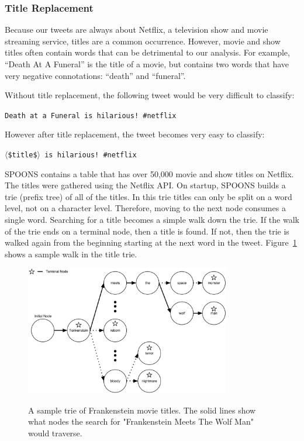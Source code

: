 \documentclass[12pt]{ucthesis}
\newcommand{\captionfonts}{\small\bf\ssp}
\begin{document}
\subsubsection{Title Replacement}
\label{class-filter-title}
Because our tweets are always about Netflix, a television show and movie streaming service,
titles are a common occurrence. However, movie and show titles often contain words that can be
detrimental to our analysis. For example, ``Death At A Funeral'' is the title of a movie, but contains
two words that have very negative connotations: ``death'' and ``funeral''.

Without title replacement, the following tweet would be very difficult to classify:

\begin{center}
   \texttt{Death at a Funeral is hilarious!  \#netflix}
\end{center}

However after title replacement, the tweet becomes very easy to classify:

\begin{center}
   \texttt{$\langle$\$title\$$\rangle$ is hilarious!  \#netflix}
\end{center}

SPOONS contains a table that has over 50,000 movie and show titles on Netflix. The titles were gathered
using the Netflix API. On startup, SPOONS builds a trie (prefix tree)\cite{trie} of all of the titles. In this trie titles can
only be split on a word level, not on a character level. Therefore, moving to the next node consumes a single word.
Searching for a title becomes a simple walk down the trie.
If the walk of the trie ends on a terminal node, then a title is found. If not, then the trie is walked again from the beginning
starting at the next word in the tweet. Figure~\ref{fig:title-trie} shows a sample walk in the title trie.


\begin{figure}
   \begin{center}
      \includegraphics[width=0.8\textwidth]{images/Title_Trie.eps}
      \captionfonts
      \caption[Title Trie Walk]{A sample trie of Frankenstein movie titles. The solid lines show what nodes the search for "Frankenstein Meets The Wolf Man" would traverse.}
      \label{fig:title-trie}
   \end{center}
\end{figure}
\end{document}
